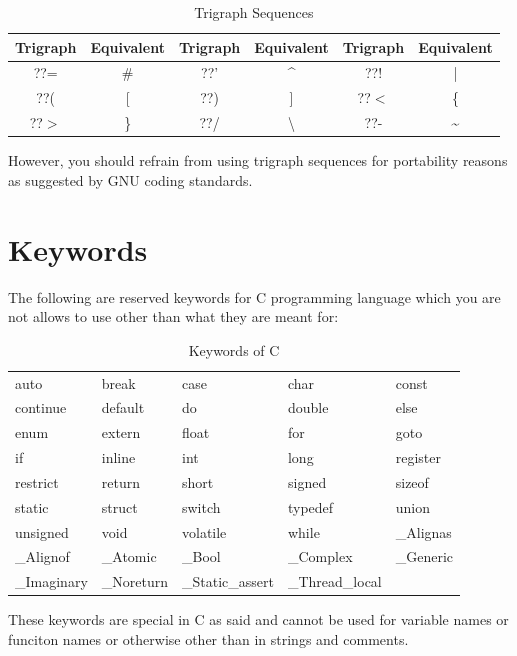 \begin{table}[H]
 \begin{center}
 \caption{Trigraph Sequences}
\begin{tabular}{|c|c|c|c|c|c|}
\hline
\textbf{Trigraph}&\textbf{Equivalent}&\textbf{Trigraph}&\textbf{Equivalent}&\textbf{Trigraph}&\textbf{Equivalent}\\
\hline
??=&\#&??'&\textasciicircum&??!&|\\
\hline
??(&[&??)&]&??$<$&\{\\
\hline
??$>$&\}&??/&\textbackslash&??-&\textasciitilde\\
\hline
\end{tabular}
\end{center}
\end{table}

However, you should refrain from using trigraph sequences for portability 
reasons as suggested by GNU coding standards.

\section{Keywords}
The following are reserved keywords for C programming language which you are not 
allows to use other than what they are meant for:
\begin{table}[H]
 \begin{center}
  \caption{Keywords of C}
  \begin{tabular}{l l l l l}
    auto & break & case & char & const\\
    continue & default & do & double & else\\
    enum & extern & float & for & goto\\
    if & inline & int & long & register\\
    restrict & return & short & signed & sizeof\\
    static & struct & switch & typedef  & union\\
    unsigned & void & volatile & while & \_Alignas\\
    \_Alignof& \_Atomic & \_Bool & \_Complex & \_Generic \\
    \_Imaginary & \_Noreturn & \_Static\_assert & \_Thread\_local\\
  \end{tabular}
 \end{center}
\end{table}

These keywords are special in C as said and cannot be used for variable names 
or funciton names or otherwise other than in strings and comments.

